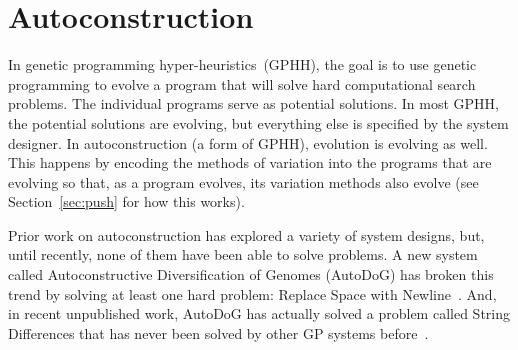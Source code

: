 \documentclass{sig-alternate}
\begin{document}
\section{Autoconstruction}
\label{sec:ac}
In genetic programming hyper-heuristics~(GPHH), the goal is to use genetic programming to evolve a program that will solve hard computational search problems. The individual programs serve as potential solutions. In most GPHH, the potential solutions are evolving, but everything else is specified by the system designer.  In autoconstruction (a form of GPHH), evolution is evolving as well. This happens by encoding the methods of variation into the programs that are evolving so that, as a program evolves, its variation methods also evolve (see Section~\ref{sec:push} for how this works). 

Prior work on autoconstruction has explored a variety of system designs, but, until recently, none of them have been able to solve  problems. A new system called Autoconstructive Diversification of Genomes (AutoDoG) has broken this trend by solving at least one hard problem: Replace Space with Newline~\cite{spector:2016}. And, in recent unpublished work, AutoDoG has actually solved a problem called String Differences that has never been solved by other GP systems before~\cite{eva:2017}.
\end{document}
